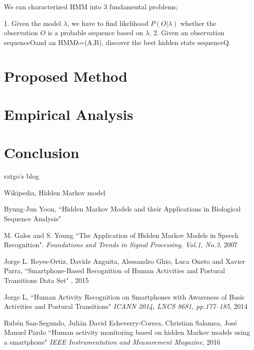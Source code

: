 \documentclass[10pt,twocolumn,letterpaper]{article}
\begin{document}
We can characterized HMM into 3 fundamental problems;

1. Given the model $\lambda$, we have to find likelihood $P(O|\lambda)$ whether the observation $O$ is a probable sequence based on $\lambda$.
2. Given an observation sequenceOand an HMMλ=(A,B), discover the best hidden state sequenceQ.

\section{Proposed Method}

\section{Empirical Analysis}

\section{Conclusion}


\begin{thebibliography}{9}

ratgo’s blog

Wikipedia, Hidden Markov model

Byung-Jun Yoon, 
``Hidden Markov Models and their Applications in Biological Sequence Analysis"

M. Gales and S. Young
``The Application of Hidden Markov Models in Speech Recognition".
{\textit{Foundations and Trends in Signal Processing, Vol.1, No.3}, 2007}

Jorge L. Reyes-Ortiz, Davide Anguita, Alessandro Ghio, Luca Oneto and Xavier Parra,
``Smartphone-Based Recognition of Human Activities and Postural Transitions Data Set"
, 2015

Jorge L, \etal
``Human Activity Recognition on Smartphones with Awareness of Basic Activities and Postural Transitions"
{\textit{ICANN 2014, LNCS 8681, pp.177–185}, 2014}

Rubén San-Segundo, Julián David Echeverry-Correa, Christian Salamea, José Manuel Pardo
``Human activity monitoring based on hidden Markov models using a smartphone"
{\textit{IEEE Instrumentation and Measurement Magazine}, 2016}

\end{thebibliography}
\end{document}

